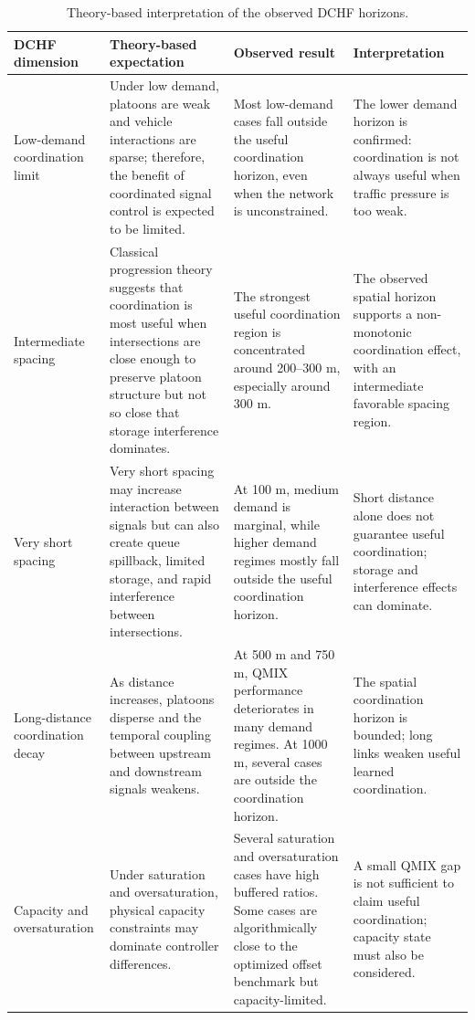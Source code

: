 \begin{table}[H]
\centering
\caption{Theory-based interpretation of the observed DCHF horizons.}
\label{tab:theory_observed_dchf_interpretation}
\small
\begin{tabular}{p{}p{}p{}p{}}
\toprule
\textbf{DCHF dimension} & \textbf{Theory-based expectation} & \textbf{Observed result} & \textbf{Interpretation} \\
\midrule
Low-demand coordination limit & Under low demand, platoons are weak and vehicle interactions are sparse; therefore, the benefit of coordinated signal control is expected to be limited. & Most low-demand cases fall outside the useful coordination horizon, even when the network is unconstrained. & The lower demand horizon is confirmed: coordination is not always useful when traffic pressure is too weak. \\
\midrule
Intermediate spacing & Classical progression theory suggests that coordination is most useful when intersections are close enough to preserve platoon structure but not so close that storage interference dominates. & The strongest useful coordination region is concentrated around 200--300 m, especially around 300 m. & The observed spatial horizon supports a non-monotonic coordination effect, with an intermediate favorable spacing region. \\
\midrule
Very short spacing & Very short spacing may increase interaction between signals but can also create queue spillback, limited storage, and rapid interference between intersections. & At 100 m, medium demand is marginal, while higher demand regimes mostly fall outside the useful coordination horizon. & Short distance alone does not guarantee useful coordination; storage and interference effects can dominate. \\
\midrule
Long-distance coordination decay & As distance increases, platoons disperse and the temporal coupling between upstream and downstream signals weakens. & At 500 m and 750 m, QMIX performance deteriorates in many demand regimes. At 1000 m, several cases are outside the coordination horizon. & The spatial coordination horizon is bounded; long links weaken useful learned coordination. \\
\midrule
Capacity and oversaturation & Under saturation and oversaturation, physical capacity constraints may dominate controller differences. & Several saturation and oversaturation cases have high buffered ratios. Some cases are algorithmically close to the optimized offset benchmark but capacity-limited. & A small QMIX gap is not sufficient to claim useful coordination; capacity state must also be considered. \\

\end{tabular}
\end{table}
